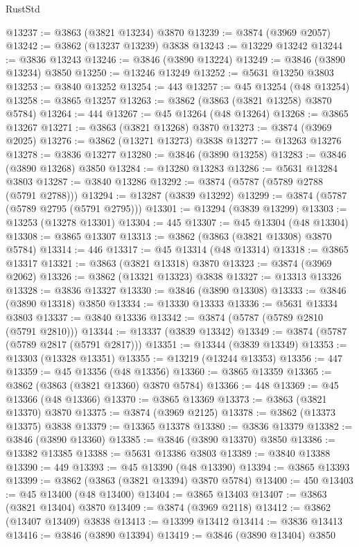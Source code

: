 \begin{lexlean}{RustStd}
\begin{coremodule}
@13237 := @3863 (@3821 @13234) @3870
@13239 := @3874 (@3969 @2057)
@13242 := @3862 (@13237 @13239) @3838
@13243 := @13229 @13242
@13244 := @3836 @13243
@13246 := @3846 (@3890 @13224)
@13249 := @3846 (@3890 @13234) @3850
@13250 := @13246 @13249
@13252 := @5631 @13250 @3803
@13253 := @3840 @13252
@13254 := 443
@13257 := @45 @13254 (@48 @13254)
@13258 := @3865 @13257
@13263 := @3862 (@3863 (@3821 @13258) @3870 @5784)
@13264 := 444
@13267 := @45 @13264 (@48 @13264)
@13268 := @3865 @13267
@13271 := @3863 (@3821 @13268) @3870
@13273 := @3874 (@3969 @2025)
@13276 := @3862 (@13271 @13273) @3838
@13277 := @13263 @13276
@13278 := @3836 @13277
@13280 := @3846 (@3890 @13258)
@13283 := @3846 (@3890 @13268) @3850
@13284 := @13280 @13283
@13286 := @5631 @13284 @3803
@13287 := @3840 @13286
@13292 := @3874 (@5787 (@5789 @2788 (@5791 @2788)))
@13294 := @13287 (@3839 @13292)
@13299 := @3874 (@5787 (@5789 @2795 (@5791 @2795)))
@13301 := @13294 (@3839 @13299)
@13303 := @13253 (@13278 @13301)
@13304 := 445
@13307 := @45 @13304 (@48 @13304)
@13308 := @3865 @13307
@13313 := @3862 (@3863 (@3821 @13308) @3870 @5784)
@13314 := 446
@13317 := @45 @13314 (@48 @13314)
@13318 := @3865 @13317
@13321 := @3863 (@3821 @13318) @3870
@13323 := @3874 (@3969 @2062)
@13326 := @3862 (@13321 @13323) @3838
@13327 := @13313 @13326
@13328 := @3836 @13327
@13330 := @3846 (@3890 @13308)
@13333 := @3846 (@3890 @13318) @3850
@13334 := @13330 @13333
@13336 := @5631 @13334 @3803
@13337 := @3840 @13336
@13342 := @3874 (@5787 (@5789 @2810 (@5791 @2810)))
@13344 := @13337 (@3839 @13342)
@13349 := @3874 (@5787 (@5789 @2817 (@5791 @2817)))
@13351 := @13344 (@3839 @13349)
@13353 := @13303 (@13328 @13351)
@13355 := @13219 (@13244 @13353)
@13356 := 447
@13359 := @45 @13356 (@48 @13356)
@13360 := @3865 @13359
@13365 := @3862 (@3863 (@3821 @13360) @3870 @5784)
@13366 := 448
@13369 := @45 @13366 (@48 @13366)
@13370 := @3865 @13369
@13373 := @3863 (@3821 @13370) @3870
@13375 := @3874 (@3969 @2125)
@13378 := @3862 (@13373 @13375) @3838
@13379 := @13365 @13378
@13380 := @3836 @13379
@13382 := @3846 (@3890 @13360)
@13385 := @3846 (@3890 @13370) @3850
@13386 := @13382 @13385
@13388 := @5631 @13386 @3803
@13389 := @3840 @13388
@13390 := 449
@13393 := @45 @13390 (@48 @13390)
@13394 := @3865 @13393
@13399 := @3862 (@3863 (@3821 @13394) @3870 @5784)
@13400 := 450
@13403 := @45 @13400 (@48 @13400)
@13404 := @3865 @13403
@13407 := @3863 (@3821 @13404) @3870
@13409 := @3874 (@3969 @2118)
@13412 := @3862 (@13407 @13409) @3838
@13413 := @13399 @13412
@13414 := @3836 @13413
@13416 := @3846 (@3890 @13394)
@13419 := @3846 (@3890 @13404) @3850

\end{coremodule}
\end{lexlean}

